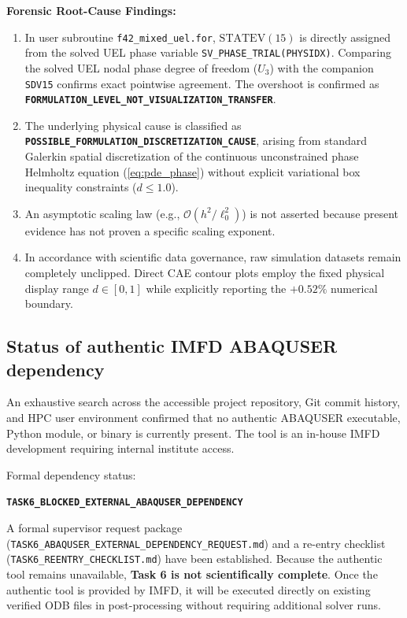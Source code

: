 \textbf{Forensic Root-Cause Findings:}
\begin{enumerate}
  \item In user subroutine \texttt{f42\_mixed\_uel.for}, $\text{STATEV}(15)$ is directly assigned from the solved UEL phase variable \texttt{SV\_PHASE\_TRIAL(PHYSIDX)}. Comparing the solved UEL nodal phase degree of freedom ($U_3$) with the companion \texttt{SDV15} confirms exact pointwise agreement. The overshoot is confirmed as \textbf{\texttt{FORMULATION\_LEVEL\_NOT\_VISUALIZATION\_TRANSFER}}.
  \item The underlying physical cause is classified as \textbf{\texttt{POSSIBLE\_FORMULATION\_DISCRETIZATION\_CAUSE}}, arising from standard Galerkin spatial discretization of the continuous unconstrained phase Helmholtz equation (\ref{eq:pde_phase}) without explicit variational box inequality constraints ($d \le 1.0$).
  \item An asymptotic scaling law (e.g., $\mathcal{O}(h^2/\ell_0^2)$) is not asserted because present evidence has not proven a specific scaling exponent.
  \item In accordance with scientific data governance, raw simulation datasets remain completely unclipped. Direct CAE contour plots employ the fixed physical display range $d \in [0, 1]$ while explicitly reporting the $+0.52\%$ numerical boundary.
\end{enumerate}

\subsection{Status of authentic IMFD ABAQUSER dependency}
An exhaustive search across the accessible project repository, Git commit history, and HPC user environment confirmed that no authentic \textsc{ABAQUSER} executable, Python module, or binary is currently present. The tool is an in-house IMFD development \citep{Roth2014} requiring internal institute access.

Formal dependency status:
\begin{center}
\textbf{\texttt{TASK6\_BLOCKED\_EXTERNAL\_ABAQUSER\_DEPENDENCY}}
\end{center}
A formal supervisor request package (\texttt{TASK6\_ABAQUSER\_EXTERNAL\_DEPENDENCY\_REQUEST.md}) and a re-entry checklist (\texttt{TASK6\_REENTRY\_CHECKLIST.md}) have been established. Because the authentic tool remains unavailable, \textbf{Task 6 is not scientifically complete}. Once the authentic tool is provided by IMFD, it will be executed directly on existing verified ODB files in post-processing without requiring additional solver runs.

